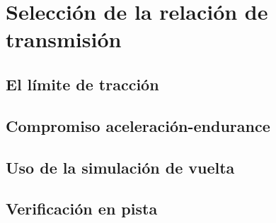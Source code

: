 \chapter{Selección de la relación de transmisión}
\label{ch:relacion_transmision}

\begin{objetivos}
  \item {}
  \item {}
  \item {}
\end{objetivos}


\section{El límite de tracción}
\label{sec:relacion_transmision:01}

\section{Compromiso aceleración-endurance}
\label{sec:relacion_transmision:02}

\section{Uso de la simulación de vuelta}
\label{sec:relacion_transmision:03}

\section{Verificación en pista}
\label{sec:relacion_transmision:04}


\begin{caso}
\end{caso}

